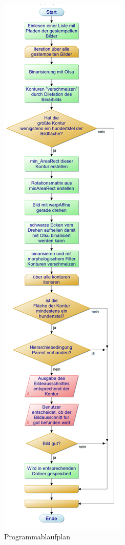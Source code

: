\documentclass[12pt,toc=bib,toc=listof]{scrreprt}
\begin{document}
\begin{figure}[h]
\begin{minipage}[t]{.6\linewidth}
\end{minipage}
\hfill
\begin{minipage}[t]{.35\linewidth}
\strut\vspace*{-\baselineskip}
\newline
  \includegraphics[width=\linewidth]{./bilder/BV_pap}
  \caption{Programmablaufplan}
  \label{fig:bv_pap}
\end{minipage}
\end{figure}
\end{document}
